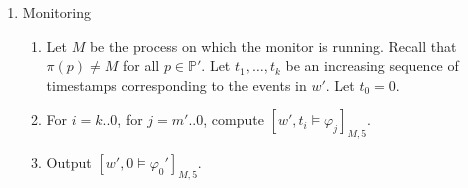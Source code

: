 \documentclass[envcountsame, runningheads]{llncs}
\newcommand{\rednote}[2][]{{\todo[color=magenta!80,size=\footnotesize,#1]{\normalcolor\normalfont#2}}}
\newcommand{\B}{\mathbb{B}}
\newcommand{\?}{\text{?}}
\begin{document}
\begin{enumerate}
		
		\item Monitoring
		\begin{enumerate}[label=\arabic*.]
			\item Let $M$ be the process on which the monitor is running. Recall that $\pi(p) \neq M$ for all $p \in \mathbb{P}'$. Let $t_1, \ldots, t_k$ be an increasing sequence of timestamps corresponding to the events in $w'$. Let $t_0 = 0$.
			\item For $i = k .. 0$, for $j = m' .. 0$, compute $[w', t_i \models \varphi_j]_{M,5}$.
			\item Output $[w',0 \models \varphi_0']_{M,5}$.
		\end{enumerate}
	\end{enumerate}
	
\end{document}
